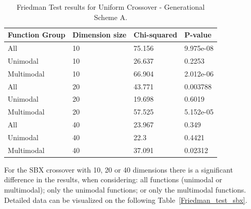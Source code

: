 \begin{table}[h]
	\centering
	\begin{tabular}{|l|l|l|l|}
		\hline
		\textbf{Function Group} & \textbf{Dimension size}      & \textbf{Chi-squared}        & \textbf{P-value}                     \\ \hline
		\multicolumn{1}{|l|}{All} & \multicolumn{1}{|l|}{10} & \multicolumn{1}{l|}{75.156} & \multicolumn{1}{l|}{9.975e-08} \\ \hline
		\multicolumn{1}{|l|}{Unimodal} & \multicolumn{1}{|l|}{10} & \multicolumn{1}{l|}{26.637} & \multicolumn{1}{l|}{0.2253} \\ \hline
		\multicolumn{1}{|l|}{Multimodal} & \multicolumn{1}{|l|}{10} & \multicolumn{1}{l|}{66.904} & \multicolumn{1}{l|}{2.012e-06}  \\ \hline
		\hline
		\multicolumn{1}{|l|}{All} & \multicolumn{1}{|l|}{20} & \multicolumn{1}{l|}{43.771} & \multicolumn{1}{l|}{0.003788} \\ \hline
		\multicolumn{1}{|l|}{Unimodal} & \multicolumn{1}{|l|}{20} & \multicolumn{1}{l|}{19.698} & \multicolumn{1}{l|}{0.6019} \\ \hline
		\multicolumn{1}{|l|}{Multimodal} & \multicolumn{1}{|l|}{20} & \multicolumn{1}{l|}{57.525} & \multicolumn{1}{l|}{5.152e-05}  \\ \hline
		\hline	
		\multicolumn{1}{|l|}{All} & \multicolumn{1}{|l|}{40} & \multicolumn{1}{l|}{23.967} & \multicolumn{1}{l|}{0.349} 						\\ \hline
		\multicolumn{1}{|l|}{Unimodal} & \multicolumn{1}{|l|}{40} & \multicolumn{1}{l|}{22.3} & \multicolumn{1}{l|}{0.4421} \\ \hline
		\multicolumn{1}{|l|}{Multimodal} & \multicolumn{1}{|l|}{40} & \multicolumn{1}{l|}{37.091} & \multicolumn{1}{l|}{0.02312}  \\ \hline
	\end{tabular}
	\caption{Friedman Test results for Uniform Crossover - Generational Scheme A.}
	\label{Friedman_test_uniform}	
\end{table}

For the SBX crossover with 10, 20 or 40 dimensions there is a significant difference in the results, when considering: all functions (unimodal or multimodal); only the unimodal functions; or only the multimodal functions. Detailed data can be visualized on the following Table~\ref{Friedman_test_sbx}. 



